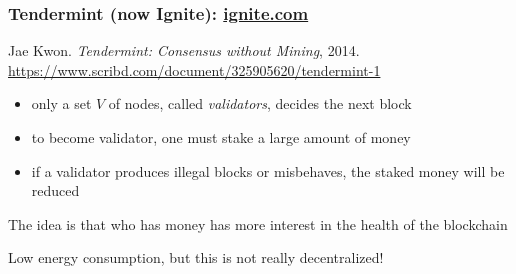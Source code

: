\documentclass[11pt]{beamer}  %
\begin{document}
\begin{frame}\frametitle{Tendermint (now Ignite): \url{ignite.com}}

  \begin{greenbox}{Jae Kwon. \emph{Tendermint: Consensus without Mining}, 2014.\\
    \url{https://www.scribd.com/document/325905620/tendermint-1}}
    \begin{itemize}
    \item only a set $V$ of nodes, called \emph{validators}, decides the next block
    \item to become validator, one must stake a large amount of money
    \item if a validator produces illegal blocks or misbehaves, the staked money will be reduced
    \end{itemize}
  \end{greenbox}

  \smallskip

  \begin{center}
    The idea is that who has money has more interest in the health of the blockchain
  \end{center}

  \smallskip

  \begin{center}
    Low energy consumption, but this is not really decentralized!
  \end{center}

\end{frame}
\end{document}
